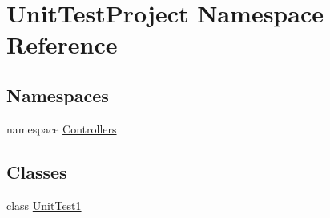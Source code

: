 \hypertarget{namespace_unit_test_project}{}\section{Unit\+Test\+Project Namespace Reference}
\label{namespace_unit_test_project}
\subsection*{Namespaces}
\begin{DoxyCompactItemize}
\item 
namespace \mbox{\hyperlink{namespace_unit_test_project_1_1_controllers}{Controllers}}
\end{DoxyCompactItemize}
\subsection*{Classes}
\begin{DoxyCompactItemize}
\item 
class \mbox{\hyperlink{class_unit_test_project_1_1_unit_test1}{Unit\+Test1}}
\end{DoxyCompactItemize}
